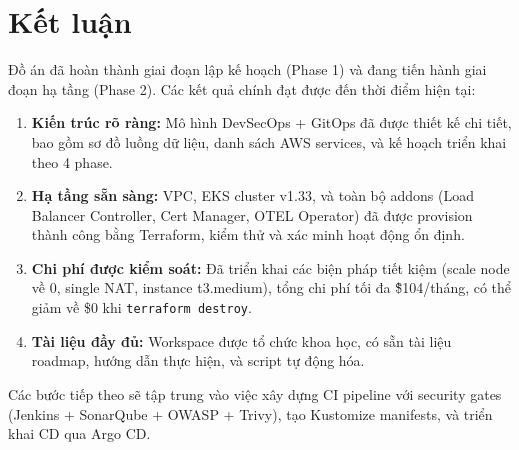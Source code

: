 \documentclass[12pt,a4paper]{article}
\begin{document}
\section{Kết luận}

Đồ án đã hoàn thành giai đoạn lập kế hoạch (Phase 1) và đang tiến hành giai đoạn hạ tầng (Phase 2). Các kết quả chính đạt được đến thời điểm hiện tại:

\begin{enumerate}[leftmargin=*,nosep]
  \item \textbf{Kiến trúc rõ ràng:} Mô hình DevSecOps + GitOps đã được thiết kế chi tiết, bao gồm sơ đồ luồng dữ liệu, danh sách AWS services, và kế hoạch triển khai theo 4 phase.
  \item \textbf{Hạ tầng sẵn sàng:} VPC, EKS cluster v1.33, và toàn bộ addons (Load Balancer Controller, Cert Manager, OTEL Operator) đã được provision thành công bằng Terraform, kiểm thử và xác minh hoạt động ổn định.
  \item \textbf{Chi phí được kiểm soát:} Đã triển khai các biện pháp tiết kiệm (scale node về 0, single NAT, instance t3.medium), tổng chi phí tối đa \~\$104/tháng, có thể giảm về \$0 khi \texttt{terraform destroy}.
  \item \textbf{Tài liệu đầy đủ:} Workspace được tổ chức khoa học, có sẵn tài liệu roadmap, hướng dẫn thực hiện, và script tự động hóa.
\end{enumerate}

Các bước tiếp theo sẽ tập trung vào việc xây dựng CI pipeline với security gates (Jenkins + SonarQube + OWASP + Trivy), tạo Kustomize manifests, và triển khai CD qua Argo CD.
\end{document}
